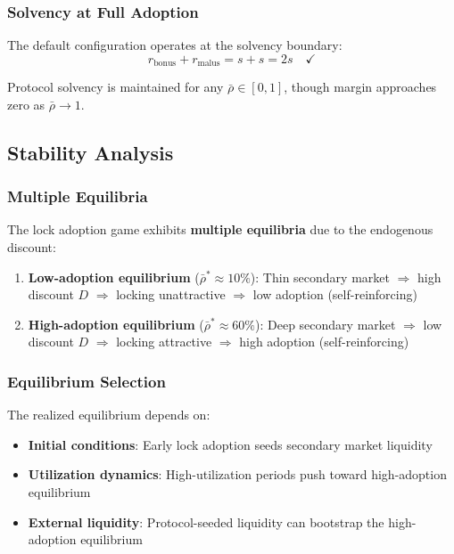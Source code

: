 \documentclass[10pt,a4paper,twocolumn]{article}
\begin{document}
\subsubsection{Solvency at Full Adoption}

The default configuration operates at the solvency boundary:
\begin{equation}
r_{\text{bonus}} + r_{\text{malus}} = s + s = 2s \quad \checkmark
\end{equation}

Protocol solvency is maintained for any $\bar{\rho} \in [0, 1]$, though margin approaches zero as $\bar{\rho} \to 1$.

\subsection{Stability Analysis}

\subsubsection{Multiple Equilibria}

The lock adoption game exhibits \textbf{multiple equilibria} due to the endogenous discount:

\begin{enumerate}
    \item \textbf{Low-adoption equilibrium} ($\bar{\rho}^* \approx 10\%$): Thin secondary market $\Rightarrow$ high discount $D$ $\Rightarrow$ locking unattractive $\Rightarrow$ low adoption (self-reinforcing)

    \item \textbf{High-adoption equilibrium} ($\bar{\rho}^* \approx 60\%$): Deep secondary market $\Rightarrow$ low discount $D$ $\Rightarrow$ locking attractive $\Rightarrow$ high adoption (self-reinforcing)
\end{enumerate}

\subsubsection{Equilibrium Selection}

The realized equilibrium depends on:
\begin{itemize}
    \item \textbf{Initial conditions}: Early lock adoption seeds secondary market liquidity
    \item \textbf{Utilization dynamics}: High-utilization periods push toward high-adoption equilibrium
    \item \textbf{External liquidity}: Protocol-seeded liquidity can bootstrap the high-adoption equilibrium
\end{itemize}
\end{document}
